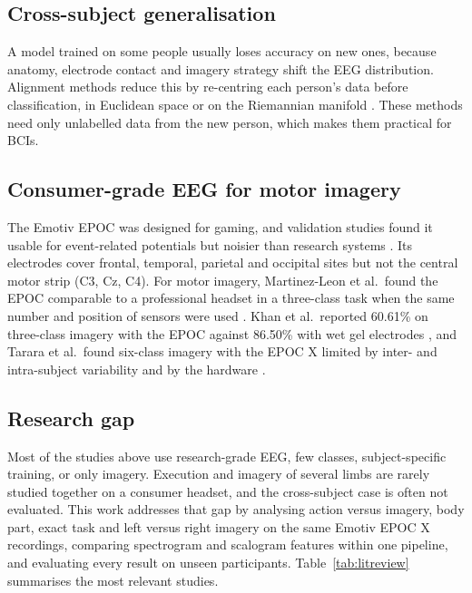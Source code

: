 \documentclass[pdflatex,sn-mathphys-num]{sn-jnl}%
\theoremstyle{thmstyleone}%
\theoremstyle{thmstyletwo}%
\theoremstyle{thmstylethree}%
\begin{document}
\subsection{Cross-subject generalisation}
A model trained on some people usually loses accuracy on new ones, because anatomy, electrode contact and imagery strategy shift the EEG distribution. Alignment methods reduce this by re-centring each person's data before classification, in Euclidean space \citep{He2020} or on the Riemannian manifold \citep{Zanini2018}. These methods need only unlabelled data from the new person, which makes them practical for BCIs.

\subsection{Consumer-grade EEG for motor imagery}
The Emotiv EPOC was designed for gaming, and validation studies found it usable for event-related potentials but noisier than research systems \citep{Badcock2013}. Its electrodes cover frontal, temporal, parietal and occipital sites but not the central motor strip (C3, Cz, C4). For motor imagery, Martinez-Leon et al.\ found the EPOC comparable to a professional headset in a three-class task when the same number and position of sensors were used \citep{MartinezLeon2016}. Khan et al.\ reported 60.61\% on three-class imagery with the EPOC against 86.50\% with wet gel electrodes \citep{Khan2019}, and Tarara et al.\ found six-class imagery with the EPOC X limited by inter- and intra-subject variability and by the hardware \citep{Tarara2025}.

\subsection{Research gap}
Most of the studies above use research-grade EEG, few classes, subject-specific training, or only imagery. Execution and imagery of several limbs are rarely studied together on a consumer headset, and the cross-subject case is often not evaluated. This work addresses that gap by analysing action versus imagery, body part, exact task and left versus right imagery on the same Emotiv EPOC X recordings, comparing spectrogram and scalogram features within one pipeline, and evaluating every result on unseen participants. Table~\ref{tab:litreview} summarises the most relevant studies.
\end{document}
